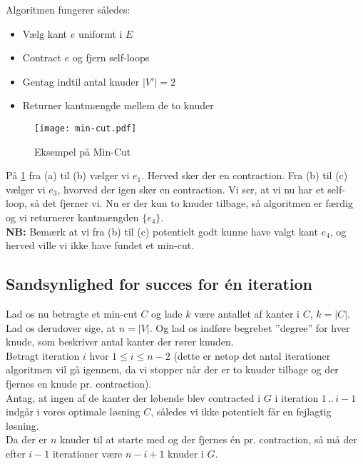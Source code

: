 Algoritmen fungerer således:
\begin{itemize}
	\item Vælg kant $e$ uniformt i $E$
	\item Contract $e$ og fjern self-loops
	\item Gentag indtil antal knuder $|V'| = 2$
	\item Returner kantmængde mellem de to knuder
\end{itemize}

\begin{figure}[H]
	\begin{center}
		\texttt{[image: min-cut.pdf]}
	\end{center}
	\caption{Eksempel på Min-Cut}
	\label{fig:min-cut}
\end{figure}

På \ref{fig:min-cut} fra (a) til (b) vælger vi $e_1$. Herved sker der en contraction. Fra (b) til (c) vælger vi $e_3$, hvorved der igen sker en contraction. Vi ser, at vi nu har et self-loop, så det fjerner vi. Nu er der kun to knuder tilbage, så algoritmen er færdig og vi returnerer kantmængden $\{e_4\}$.\\

\textbf{NB:} Bemærk at vi fra (b) til (c) potentielt godt kunne have valgt kant $e_4$, og herved ville vi ikke have fundet et min-cut.





\subsection{Sandsynlighed for succes for én iteration}
Lad os nu betragte et min-cut $C$ og lade $k$ være antallet af kanter i $C$, $k = |C|$. Lad os derudover sige, at $n = |V|$. Og lad os indføre begrebet ''degree'' for hver knude, som beskriver antal kanter der rører knuden.\\

Betragt iteration $i$ hvor $1 \leq i \leq n-2$ (dette er netop det antal iterationer algoritmen vil gå igennem, da vi stopper når der er to knuder tilbage og der fjernes en knude pr. contraction).\\


Antag, at ingen af de kanter der løbende blev contracted i $G$ i iteration $1 \, .. \, i-1$  indgår i vores optimale løsning $C$, således vi ikke potentielt får en fejlagtig løsning.\\

Da der er $n$ knuder til at starte med og der fjernes én pr. contraction, så må der efter $i-1$ iterationer være $n-i+1$ knuder i $G$.\\

